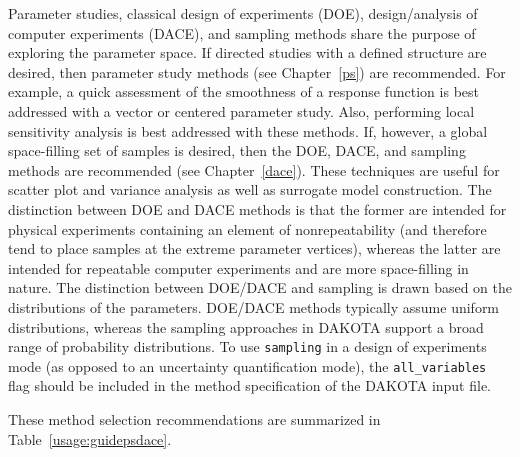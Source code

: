 Parameter studies, classical design of experiments (DOE),
design/analysis of computer experiments (DACE), and sampling methods
share the purpose of exploring the parameter space.  If directed
studies with a defined structure are desired, then parameter study
methods (see Chapter~\ref{ps}) are recommended. For example, a quick
assessment of the smoothness of a response function is best addressed
with a vector or centered parameter study. Also, performing local
sensitivity analysis is best addressed with these methods. If,
however, a global space-filling set of samples is desired, then the
DOE, DACE, and sampling methods are recommended (see
Chapter~\ref{dace}).  These techniques are useful for scatter plot and
variance analysis as well as surrogate model construction. The
distinction between DOE and DACE methods is that the former are
intended for physical experiments containing an element of
nonrepeatability (and therefore tend to place samples at the extreme
parameter vertices), whereas the latter are intended for repeatable
computer experiments and are more space-filling in nature. The
distinction between DOE/DACE and sampling is drawn based on the
distributions of the parameters.  DOE/DACE methods typically assume
uniform distributions, whereas the sampling approaches in DAKOTA
support a broad range of probability distributions. To use
\texttt{sampling} in a design of experiments mode (as opposed to
an uncertainty quantification mode), the \texttt{all\_variables} flag
should be included in the method specification of the DAKOTA input
file.

These method selection recommendations are summarized in
Table~\ref{usage:guidepsdace}.

